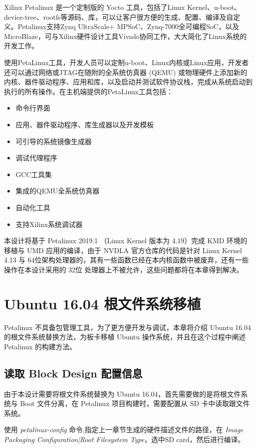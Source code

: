 Xilinx Petalinux 是一个定制版的 Yocto 工具，包括了Linux Kernel、u-boot、device-tree、rootfs等源码、库，可以让客户很方便的生成、配置、编译及自定义。Petalinux支持Zynq UltraScale+ MPSoC、Zynq-7000全可编程SoC，以及MicroBlaze，可与Xilinx硬件设计工具Vivado协同工作，大大简化了Linux系统的开发工作。

使用PetaLinux工具，开发人员可以定制u-boot、Linux内核或Linux应用，开发者还可以通过网络或JTAG在随附的全系统仿真器 (QEMU) 或物理硬件上添加新的内核、器件驱动程序、应用和库，以及启动并测试软件协议栈，完成从系统启动到执行的所有操作。在主机端提供的PetaLinux工具包括：

\begin{itemize}
    \item 命令行界面
    \item 应用、器件驱动程序、库生成器以及开发模板
    \item 可引导的系统镜像生成器
    \item 调试代理程序
    \item GCC工具集
    \item 集成的QEMU全系统仿真器
    \item 自动化工具
    \item 支持Xilinx系统调试器
\end{itemize}

本设计将基于 Petalinux 2019.1 （Linux Kernel 版本为 4.19）完成 KMD 环境的移植与 UMD 应用的编译，由于 NVDLA 官方仓库的代码是针对 Linux Kernel 4.13 与 64位架构处理器的，其有一些函数已经在本内核函数中被废弃，还有一些操作在本设计采用的 32位 处理器上不被允许，这些问题都将在本章得到解决。

\section{Ubuntu 16.04 根文件系统移植}

Petalinux 不具备包管理工具，为了更方便开发与调试，本章将介绍 Ubuntu 16.04 的根文件系统替换方法，为板卡移植 Ubuntu 操作系统，并且在这个过程中阐述 Petalinux 的构建方法。

\subsection{读取 Block Design 配置信息}

由于本设计需要将根文件系统替换为 Ubuntu 16.04，首先需要做的是将根文件系统与 Boot 文件分离，在 Petalinux 项目构建时，需要配置从 SD 卡中读取跟文件系统。

使用 \emph{petalinux-config} 命令,指定上一章节生成的硬件描述文件的路径，在 \emph{Image Packaging Configuration|Root Filesystem Type}，选中SD card，然后进行编译。

